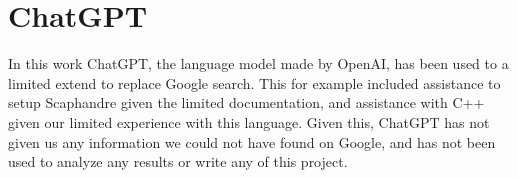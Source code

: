 \section{ChatGPT}\label{app:chat-gpt}

In this work ChatGPT, the language model made by OpenAI, has been used to a limited extend to replace Google search. This for example included assistance to setup Scaphandre given the limited documentation, and assistance with C++ given our limited experience with this language. Given this, ChatGPT has not given us any information we could not have found on Google, and has not been used to analyze any results or write any of this project.